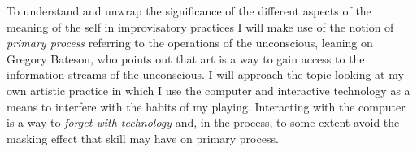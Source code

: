 \documentclass[a4paper]{article}
\begin{document}
To understand and unwrap the significance of the different aspects of the meaning of the self in improvisatory practices I will make use of the notion of \emph{primary process} referring to the operations of the unconscious, leaning on Gregory Bateson, who points out that art is a way to gain access to the information streams of the unconscious. I will approach the topic looking at my own artistic practice in which I use the computer and interactive technology as a means to interfere with the habits of my playing. Interacting with the computer is a way to \emph{forget with technology} and, in the process, to some extent avoid the masking effect that skill may have on primary process. 








\end{document}
